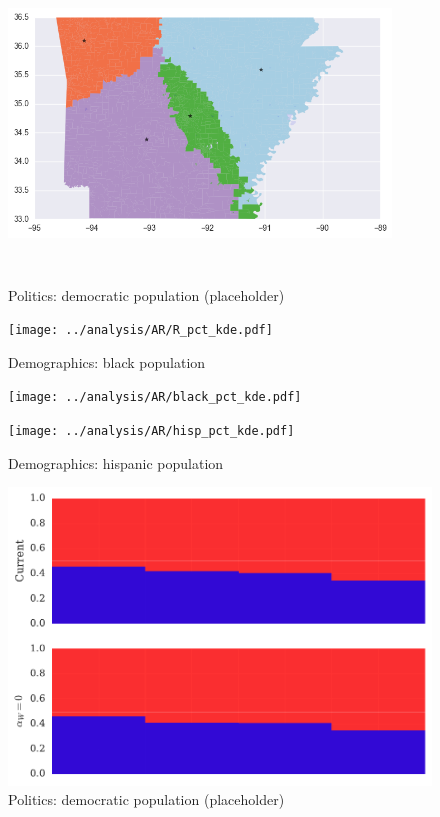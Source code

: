 \begin{figure}[htb!]
\includegraphics[width=4in,height=3in,keepaspectratio]{../maps/AR/static/0_25_after.png}
\end{figure}

\clearpage
\newpage

\begin{figure}[htb!] \centering
\caption{ Politics: democratic population (placeholder)}
\texttt{[image: ../analysis/AR/R\_pct\_kde.pdf]}
\caption{ Demographics: black population }
\texttt{[image: ../analysis/AR/black\_pct\_kde.pdf]}
\caption{ Demographics: hispanic population }
\texttt{[image: ../analysis/AR/hisp\_pct\_kde.pdf]}
\end{figure}

\clearpage
\newpage

\begin{figure}[htb!] \centering
\caption{ Politics: democratic population (placeholder)}
\includegraphics[width=6in]{../analysis/AR/barplot.pdf}
\end{figure}

